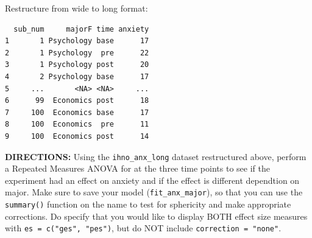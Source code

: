 \documentclass[
]{article}
\newenvironment{Shaded}{\begin{snugshade}}{\end{snugshade}}
\newcommand{\DataTypeTok}[1]{\textcolor[rgb]{0.13,0.29,0.53}{#1}}
\newcommand{\KeywordTok}[1]{\textcolor[rgb]{0.13,0.29,0.53}{\textbf{#1}}}
\newcommand{\NormalTok}[1]{#1}
\newcommand{\OperatorTok}[1]{\textcolor[rgb]{0.81,0.36,0.00}{\textbf{#1}}}
\newcommand{\StringTok}[1]{\textcolor[rgb]{0.31,0.60,0.02}{#1}}
\begin{document}
Restructure from wide to long format:

\begin{Shaded}
\end{Shaded}

\begin{Shaded}
\end{Shaded}

\begin{verbatim}
  sub_num     majorF time anxiety
1       1 Psychology base      17
2       1 Psychology  pre      22
3       1 Psychology post      20
4       2 Psychology base      17
5     ...       <NA> <NA>     ...
6      99  Economics post      18
7     100  Economics base      17
8     100  Economics  pre      11
9     100  Economics post      14
\end{verbatim}

\textbf{DIRECTIONS:} Using the \texttt{ihno\_anx\_long} dataset
restructured above, perform a Repeated Measures ANOVA for at the three
time points to see if the experiment had an effect on anxiety and if the
effect is different dependtion on major. Make sure to save your model
(\texttt{fit\_anx\_major}), so that you can use the \texttt{summary()}
function on the name to test for sphericity and make appropriate
corrections. Do specify that you would like to display BOTH effect size
measures with \texttt{es\ =\ c("ges",\ "pes")}, but do NOT include
\texttt{correction\ =\ "none"}.
\end{document}
